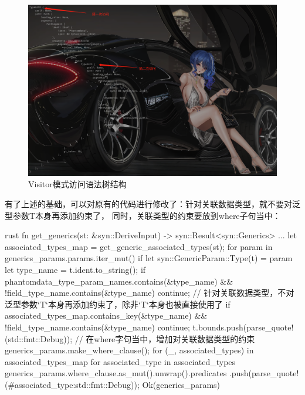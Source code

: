\begin{figure}[H]
  \centering
  \includegraphics[width=\linewidth]{rust_syn_visitor.png}
  \caption{Visitor模式访问语法树结构}
  \label{fig:rust_syn_visitor}
\end{figure}

有了上述的基础，可以对原有的代码进行修改了：针对关联数据类型，就不要对泛型参数T本身再添加约束了，
同时，关联类型的约束要放到where子句当中：
\begin{code-block}{rust}
fn get_generics(st: &syn::DeriveInput) -> syn::Result<syn::Generics> {
    ...
    let associated_types_map = get_generic_associated_types(st);
    for param in generics_params.params.iter_mut() {
        if let syn::GenericParam::Type(t) = param {
            let type_name = t.ident.to_string();
            if phantomdata_type_param_names.contains(&type_name)
                && !field_type_name.contains(&type_name)
            { continue; }
            // 针对关联数据类型，不对泛型参数`T`本身再添加约束了，除非`T`本身也被直接使用了
            if associated_types_map.contains_key(&type_name)
                && !field_type_name.contains(&type_name)
            { continue; }
            t.bounds.push(parse_quote!(std::fmt::Debug));
        }
    }
    // 在where字句当中，增加对关联数据类型的约束
    generics_params.make_where_clause();
    for (_, associated_types) in associated_types_map {
        for associated_type in associated_types {
            generics_params.where_clause.as_mut().unwrap().predicates
                .push(parse_quote!(#associated_type:std::fmt::Debug));
        }
    }
    Ok(generics_params)
}
\end{code-block}

